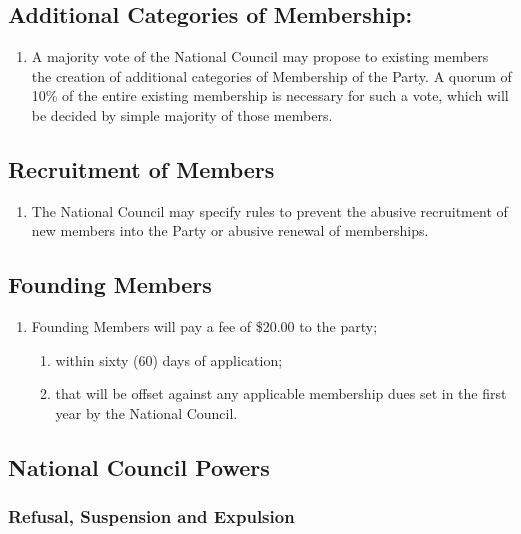\documentclass[a4paper,titlepage,8.5pt]{article}
\begin{document}
\subsection{Additional Categories of Membership:} 

\begin{enumerate}
\item A majority vote of the National Council may propose to existing members the creation of additional categories of Membership of the Party. A quorum of 10\% of the entire existing membership is necessary for such a vote, which will be decided by simple majority of those members. 
\end{enumerate}

\subsection{Recruitment of Members}

\begin{enumerate}
\item The National Council may specify rules to prevent the abusive recruitment of new members into the Party or abusive renewal of memberships. 
\end{enumerate}

\subsection{Founding Members}
\begin{enumerate}
\item Founding Members will pay a fee of \$20.00 to the party;
\begin{enumerate}
\item within sixty (60) days of application;
\item that will be offset against any applicable membership dues set in the first year by the National Council.
\end{enumerate}
\end{enumerate}

\subsection{National Council Powers}

\subsubsection{Refusal, Suspension and Expulsion}
\end{document}
